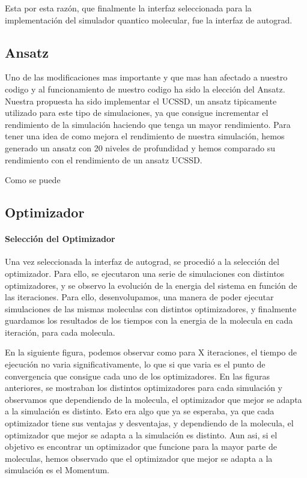 Esta por esta razón, que finalmente la interfaz seleccionada para la implementación del simulador quantico molecular, fue la interfaz de autograd.
\subsection{Ansatz}
Uno de las modificaciones mas importante y que mas han afectado a nuestro codigo y al funcionamiento de nuestro codigo ha sido la elección del Ansatz. Nuestra propuesta ha sido implementar el UCSSD, un ansatz tipicamente utilizado para este tipo de simulaciones, ya que consigue incrementar el rendimiento de la simulación haciendo que tenga un mayor rendimiento. Para tener una idea de como mejora el rendimiento de nuestra simulación, hemos generado un ansatz con 20 niveles de profundidad y hemos comparado su rendimiento con el rendimiento de un ansatz UCSSD. 


Como se puede 
\subsection{Optimizador}
\paragraph{Selección del Optimizador}
Una vez seleccionada la interfaz de autograd, se procedió a la selección del optimizador. Para ello, se ejecutaron una serie de simulaciones con distintos optimizadores, y se observo la evolución de la energia del sistema en función de las iteraciones. Para ello, desenvolupamos, una manera de poder ejecutar simulaciones de las mismas moleculas con distintos optimizadores, y finalmente guardamos los resultados de los tiempos con la energia de la molecula en cada iteración, para cada molecula. 

En la siguiente figura, podemos observar como para X iteraciones, el tiempo de ejecución no varia significativamente, lo que si que varia es el punto de convergencia que consigue cada uno de los optimizadores. En las figuras anteriores, se mostraban los distintos optimizadores para cada simulación y observamos que dependiendo de la molecula, el optimizador que mejor se adapta a la simulación es distinto. Esto era algo que ya se esperaba, ya que cada optimizador tiene sus ventajas y desventajas, y dependiendo de la molecula, el optimizador que mejor se adapta a la simulación es distinto. Aun asi, si el objetivo es encontrar un optimizador que funcione para la mayor parte de moleculas, hemos observado que el optimizador que mejor se adapta a la simulación es el Momentum. %

